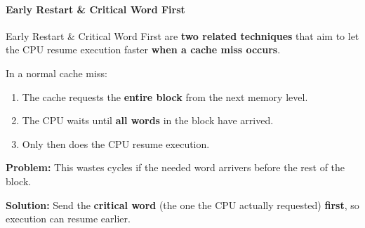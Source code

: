 \paragraph{Early Restart \& Critical Word First}\label{paragraph: Early Restart and Critical Word First}

Early Restart \& Critical Word First are \textbf{two related techniques} that aim to let the CPU resume execution faster \textbf{when a cache miss occurs}.

\highspace
In a normal cache miss:
\begin{enumerate}
    \item The cache requests the \textbf{entire block} from the next memory level.
    \item The CPU waits until \textbf{all words} in the block have arrived.
    \item Only then does the CPU resume execution.
\end{enumerate}
\textcolor{Red2}{ \textbf{Problem:}} This wastes cycles if the needed word arrivers before the rest of the block.

\highspace
\textcolor{Green3}{ \textbf{Solution:}} Send the \textbf{critical word} (the one the CPU actually requested) \textbf{first}, so execution can resume earlier.

